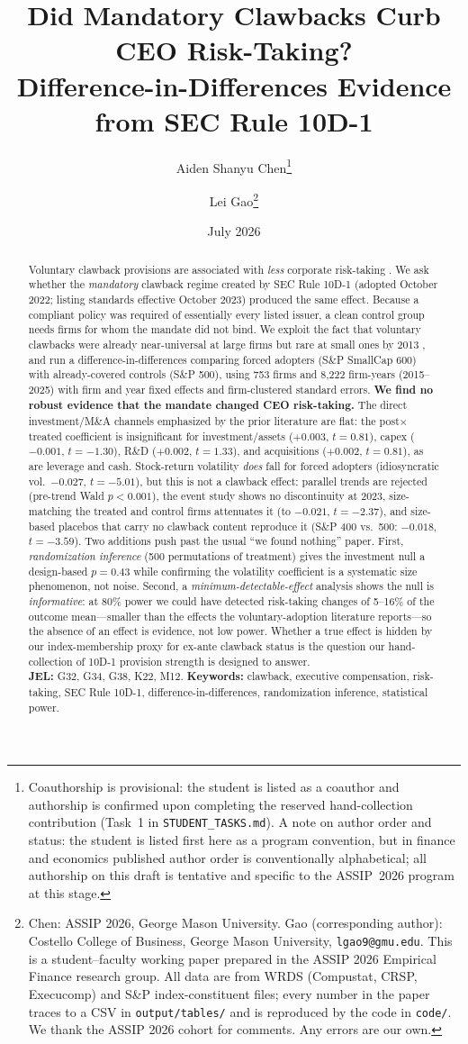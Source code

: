 \documentclass[12pt]{article}
\title{\textbf{Did Mandatory Clawbacks Curb CEO Risk-Taking?\\
Difference-in-Differences Evidence from SEC Rule 10D-1}}
\author{Aiden Shanyu Chen\thanks{Coauthorship is provisional: the student is listed as a coauthor and authorship is confirmed upon completing the reserved hand-collection contribution (Task~1 in \texttt{STUDENT\_TASKS.md}). A note on author order and status: the student is listed first here as a program convention, but in finance and economics published author order is conventionally alphabetical; all authorship on this draft is tentative and specific to the ASSIP~2026 program at this stage.} \and Lei Gao\thanks{Chen: ASSIP 2026, George Mason University.
Gao (corresponding author): Costello College of Business, George Mason University,
\texttt{lgao9@gmu.edu}. This is a student--faculty working paper prepared in the ASSIP 2026
Empirical Finance research group. All data are from WRDS (Compustat, CRSP, Execucomp) and
S\&P index-constituent files; every number in the paper traces to a CSV in
\texttt{output/tables/} and is reproduced by the code in \texttt{code/}. We thank the ASSIP
2026 cohort for comments. Any errors are our own.}}
\date{July 2026}
\begin{document}
\maketitle

\begin{abstract}
\noindent Voluntary clawback provisions are associated with \emph{less} corporate
risk-taking \citep{liu2020,babenko2023}. We ask whether the \emph{mandatory} clawback
regime created by SEC Rule 10D-1 (adopted October 2022; listing standards effective
October 2023) produced the same effect. Because a compliant policy was required of
essentially every listed issuer, a clean control group needs firms for whom the mandate
did not bind. We exploit the fact that voluntary clawbacks were already near-universal at
large firms but rare at small ones by 2013 \citep{babenko2023}, and run a
difference-in-differences comparing forced adopters (S\&P SmallCap 600) with already-covered
controls (S\&P 500), using 753 firms and 8{,}222 firm-years (2015--2025) with firm and year
fixed effects and firm-clustered standard errors. \textbf{We find no robust evidence that the
mandate changed CEO risk-taking.} The direct investment/M\&A channels emphasized by the prior
literature are flat: the post$\times$treated coefficient is insignificant for
investment/assets ($+0.003$, $t=0.81$), capex ($-0.001$, $t=-1.30$), R\&D ($+0.002$,
$t=1.33$), and acquisitions ($+0.002$, $t=0.81$), as are leverage and cash. Stock-return
volatility \emph{does} fall for forced adopters (idiosyncratic vol.\ $-0.027$, $t=-5.01$), but
this is not a clawback effect: parallel trends are rejected (pre-trend Wald $p<0.001$), the
event study shows no discontinuity at 2023, size-matching the treated and control firms
attenuates it (to $-0.021$, $t=-2.37$), and size-based placebos that carry no clawback content
reproduce it (S\&P 400 vs.\ 500: $-0.018$, $t=-3.59$). Two additions push past the usual
``we found nothing'' paper. First, \emph{randomization inference} (500 permutations of
treatment) gives the investment null a design-based $p=0.43$ while confirming the volatility
coefficient is a systematic size phenomenon, not noise. Second, a \emph{minimum-detectable-effect}
analysis shows the null is \emph{informative}: at 80\% power we could have detected risk-taking
changes of 5--16\% of the outcome mean---smaller than the effects the voluntary-adoption
literature reports---so the absence of an effect is evidence, not low power. Whether a true
effect is hidden by our index-membership proxy for ex-ante clawback status is the question our
hand-collection of 10D-1 provision strength is designed to answer.\\[4pt]
\noindent\textbf{JEL:} G32, G34, G38, K22, M12. \quad
\textbf{Keywords:} clawback, executive compensation, risk-taking, SEC Rule 10D-1,
difference-in-differences, randomization inference, statistical power.
\end{abstract}
\end{document}
